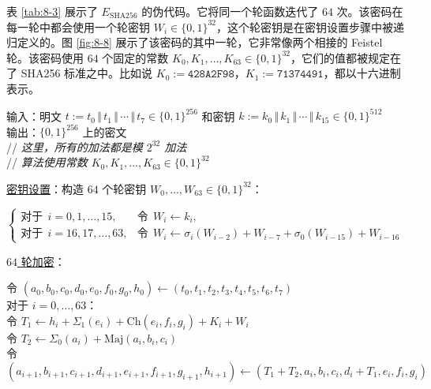 \begin{snote}
表 \ref{tab:8-3} 展示了 $E_\mathrm{SHA256}$ 的伪代码。它将同一个轮函数迭代了 $64$ 次。该密码在每一轮中都会使用一个轮密钥 $W_i\in\{0,1\}^{32}$，这个轮密钥是在密钥设置步骤中被递归定义的。图 \ref{fig:8-8} 展示了该密码的其中一轮，它非常像两个相接的 Feistel 轮。该密码使用 $64$ 个固定的常数 $K_0,K_1,\dots,K_{63}\in\{0,1\}^{32}$，它们的值都被规定在了 SHA256 标准之中。比如说 $K_0:=\mathtt{428A2F98}$，$K_1:=\mathtt{71374491}$，都以十六进制表示。

\begin{table}
\hspace*{5pt} 输入：明文 $t:=t_0\,\Vert\,t_1\,\Vert\,\cdots\,\Vert\,t_{7}\in\{0,1\}^{256}$ 和密钥 $k:=k_0\,\Vert\,k_1\,\Vert\,\cdots\,\Vert\,k_{15}\in\{0,1\}^{512}$\\
\hspace*{5pt} 输出：$\{0,1\}^{256}$ 上的密文\\
\hspace*{20pt} // \emph{这里，所有的加法都是模 $2^{32}$ 加法}\\
\hspace*{20pt} // \emph{算法使用常数 $K_0,K_1,\dots,K_{63}\in\{0,1\}^{32}$ }

\vspace{15pt}

\hspace*{5pt} \underline{密钥设置}：构造 $64$ 个轮密钥 $W_0,\dots,W_{63}\in\{0,1\}^{32}$：

\vspace{5pt}

\hspace*{40pt}
\(
\left\{
\begin{array}{ll}
\text{对于}\;\, i=0,1,\dots,15, & \text{令}\;\, W_i\leftarrow k_i, \\
\text{对于}\;\, i=16,17,\dots,63, & \text{令}\;\, W_i\leftarrow \sigma_i(W_{i-2}) + W_{i-7} + \sigma_0(W_{i-15}) + W_{i-16}
\end{array}
\right.
\)

\vspace{15pt}

\hspace*{5pt} \underline{$64$ 轮加密}：

\vspace{5pt}

\hspace*{20pt} 令 $(a_0,b_0,c_0,d_0,e_0,f_0,g_0,h_0)\leftarrow(t_0,t_1,t_2,t_3,t_4,t_5,t_6,t_7)$\\
\hspace*{20pt} 对于 $i=0,\dots,63$：\\
\hspace*{45pt} 令 $T_1\leftarrow h_i+\Sigma_1(e_i)+\mathrm{Ch}(e_i,f_i,g_i)+K_i+W_i$\\
\hspace*{45pt} 令 $T_2\leftarrow \Sigma_0(a_i)+\mathrm{Maj}(a_i,b_i,c_i)$\\
\hspace*{45pt} 令 $(a_{i+1},b_{i+1},c_{i+1},d_{i+1},e_{i+1},f_{i+1},g_{i+1},h_{i+1})\leftarrow(T_1+T_2,a_i,b_i,c_i,d_i+T_1,e_i,f_i,g_i)$


\end{table}
\end{snote}

